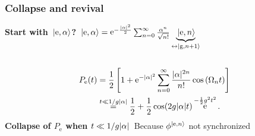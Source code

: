 \documentclass[t]{beamer}
\DeclareMathOperator{\ee}{e}
\begin{document}
\begin{frame}
\frametitle{Collapse and revival}

\textbf{Start with $\ket*{\text{e}, \alpha}$?} $\ket*{\text{e}, \alpha} =  \ee^{- \frac{\abs*{\alpha}^2}{2}} 
\sum_{n=0}^{\infty} \frac{\alpha^n}{\sqrt{n!}} \underbrace{\ket*{\text{e}, n}}_{\leftrightarrow \ket*{\text{g}, n+1}}$

\begin{columns}[T]
    \begin{column}{0.7\textwidth}
        \[
            \begin{aligned}
                P_\text{e}(t) &= \frac{1}{2}\left[1+\mathrm{e}^{-|\alpha|^2} \sum_{n=0}^{\infty} \frac{|\alpha|^{2 n}}{n !} \cos \left(\Omega_n t\right)\right] \\ 
                &\stackrel{t \ll 1 / g \abs*{\alpha}}{=} \frac{1}{2} + \frac{1}{2} \cos (2 g \abs{\alpha} t) \ee^{- \frac{1}{2} g^2 t^2}.
            \end{aligned}
        \]
        \textbf{Collapse of $P_{\text{e}}$ when $t \ll 1 / g \abs*{\alpha}$} 
        Because $\phi^{\ket*{\text{e},n}}$ not synchronized
        

\end{column}
\end{columns}
\end{frame}
\end{document}
